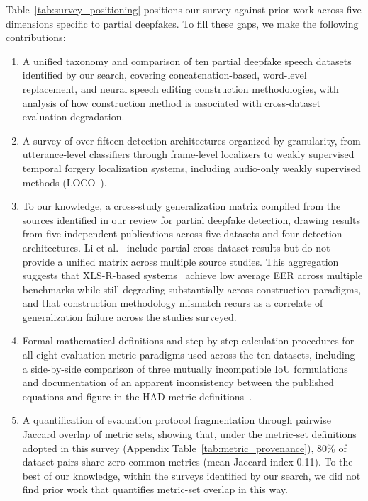 \documentclass[journal]{IEEEtran}
\begin{document}
Table~\ref{tab:survey_positioning} positions our survey against prior work across five dimensions specific to partial deepfakes. To fill these gaps, we make the following contributions:
\begin{enumerate}
\item A unified taxonomy and comparison of ten partial deepfake speech datasets identified by our search, covering concatenation-based, word-level replacement, and neural speech editing construction methodologies, with analysis of how construction method is associated with cross-dataset evaluation degradation.
\item A survey of over fifteen detection architectures organized by granularity, from utterance-level classifiers through frame-level localizers to weakly supervised temporal forgery localization systems, including audio-only weakly supervised methods (LOCO~\cite{10.24963/ijcai.2025/65}).
\item To our knowledge, a cross-study generalization matrix compiled from the sources identified in our review for partial deepfake detection, drawing results from five independent publications across five datasets and four detection architectures. Li et al.~\cite{li2025survey} include partial cross-dataset results but do not provide a unified matrix across multiple source studies. This aggregation suggests that XLS-R-based systems~\cite{zhang2024xlrsls,wu2024cfprf,10.24963/ijcai.2025/65} achieve low average EER across multiple benchmarks while still degrading substantially across construction paradigms, and that construction methodology mismatch recurs as a correlate of generalization failure across the studies surveyed.
\item Formal mathematical definitions and step-by-step calculation procedures for all eight evaluation metric paradigms used across the ten datasets, including a side-by-side comparison of three mutually incompatible IoU formulations and documentation of an apparent inconsistency between the published equations and figure in the HAD metric definitions~\cite{yi2021had}.
\item A quantification of evaluation protocol fragmentation through pairwise Jaccard overlap of metric sets, showing that, under the metric-set definitions adopted in this survey (Appendix Table~\ref{tab:metric_provenance}), 80\% of dataset pairs share zero common metrics (mean Jaccard index 0.11). To the best of our knowledge, within the surveys identified by our search, we did not find prior work that quantifies metric-set overlap in this way.
\end{enumerate}
\end{document}
